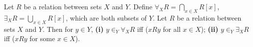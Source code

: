  Let $R$ be a relation between sets $X$ and $Y$. Define $\forall_X R = \bigcap_{x \in X} R[x]$, $\exists_X R = \bigcup_{x \in X} R[x]$, which are both subsets of $Y$.
 Let $R$ be a relation between sets $X$ and $Y$. Then for $y \in Y$, \textbf{(i)} $y \in_Y \forall_X R$ iff ($xRy$ for all $x \in X$); \textbf{(ii)} $y \in_Y \exists_X R$ iff ($xRy$ for some $x \in X$).
